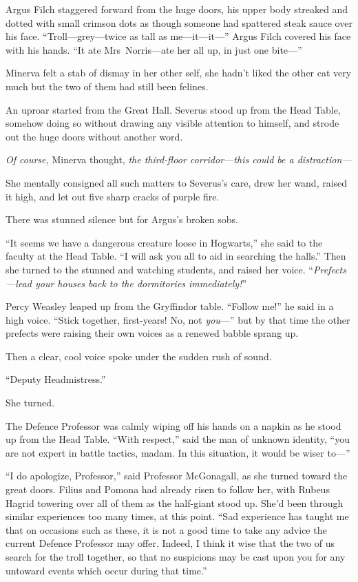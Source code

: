 Argus Filch staggered forward from the huge doors, his upper body streaked and dotted with small crimson dots as though someone had spattered steak sauce over his face. “Troll—grey—twice as tall as me—it—it—” Argus Filch covered his face with his hands. “It ate Mrs~Norris—ate her all up, in just one bite—”

Minerva felt a stab of dismay in her other self, she hadn’t liked the other cat very much but the two of them had still been felines.

An uproar started from the Great Hall. Severus stood up from the Head Table, somehow doing so without drawing any visible attention to himself, and strode out the huge doors without another word.

\emph{Of course,} Minerva thought, \emph{the third-floor corridor—this could be a distraction—}

She mentally consigned all such matters to Severus’s care, drew her wand, raised it high, and let out five sharp cracks of purple fire.

There was stunned silence but for Argus’s broken sobs.

“It seems we have a dangerous creature loose in Hogwarts,” she said to the faculty at the Head Table. “I will ask you all to aid in searching the halls.” Then she turned to the stunned and watching students, and raised her voice. “\emph{Prefects—lead your houses back to the dormitories immediately!}”

Percy Weasley leaped up from the Gryffindor table. “Follow me!” he said in a high voice. “Stick together, first-years! No, not \emph{you}—” but by that time the other prefects were raising their own voices as a renewed babble sprang up.

Then a clear, cool voice spoke under the sudden rush of sound.

“Deputy Headmistress.”

She turned.

The Defence Professor was calmly wiping off his hands on a napkin as he stood up from the Head Table. “With respect,” said the man of unknown identity, “you are not expert in battle tactics, madam. In this situation, it would be wiser to—”

“I do apologize, Professor,” said Professor McGonagall, as she turned toward the great doors. Filius and Pomona had already risen to follow her, with Rubeus Hagrid towering over all of them as the half-giant stood up. She’d been through similar experiences too many times, at this point. “Sad experience has taught me that on occasions such as these, it is not a good time to take any advice the current Defence Professor may offer. Indeed, I think it wise that the two of us search for the troll together, so that no suspicions may be cast upon you for any untoward events which occur during that time.”

